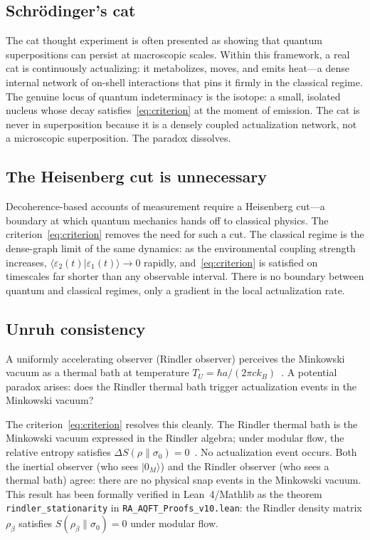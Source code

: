 \documentclass[11pt,twocolumn]{article}
\newcommand{\braket}[2]{\langle #1|#2\rangle}
\begin{document}
\subsection{Schr\"odinger's cat}

The cat thought experiment is often presented as showing that
quantum superpositions can persist at macroscopic scales.
Within this framework, a real cat is continuously actualizing:
it metabolizes, moves, and emits heat---a dense internal network
of on-shell interactions that pins it firmly in the classical regime.
The genuine locus of quantum indeterminacy is the isotope: a small,
isolated nucleus whose decay satisfies~\eqref{eq:criterion} at
the moment of emission.
The cat is never in superposition because it is a densely coupled
actualization network, not a microscopic superposition.
The paradox dissolves.

\subsection{The Heisenberg cut is unnecessary}

Decoherence-based accounts of measurement require a Heisenberg
cut---a boundary at which quantum mechanics hands off to classical
physics. The criterion~\eqref{eq:criterion} removes the need for
such a cut.
The classical regime is the dense-graph limit of the same dynamics:
as the environmental coupling strength increases,
$\braket{\varepsilon_2(t)}{\varepsilon_1(t)} \to 0$ rapidly,
and~\eqref{eq:criterion} is satisfied on timescales far shorter
than any observable interval.
There is no boundary between quantum and classical regimes,
only a gradient in the local actualization rate.

\subsection{Unruh consistency}

A uniformly accelerating observer (Rindler observer) perceives
the Minkowski vacuum as a thermal bath at temperature
$T_U = \hbar a / (2\pi c k_B)$~\cite{Unruh1976}.
A potential paradox arises: does the Rindler thermal bath trigger
actualization events in the Minkowski vacuum?

The criterion~\eqref{eq:criterion} resolves this cleanly.
The Rindler thermal bath is the Minkowski vacuum expressed in
the Rindler algebra; under modular flow, the relative entropy
satisfies $\Delta S(\rho\|\sigma_0) = 0$~\cite{Haag1996}.
No actualization event occurs.
Both the inertial observer (who sees $|0_M\rangle$) and the
Rindler observer (who sees a thermal bath) agree: there are no
physical snap events in the Minkowski vacuum.
This result has been formally verified in Lean~4/Mathlib as the
theorem \texttt{rindler\_stationarity} in
\texttt{RA\_AQFT\_Proofs\_v10.lean}:
the Rindler density matrix $\rho_\beta$ satisfies
$S(\rho_\beta\|\sigma_0) = 0$ under modular flow.
\end{document}
